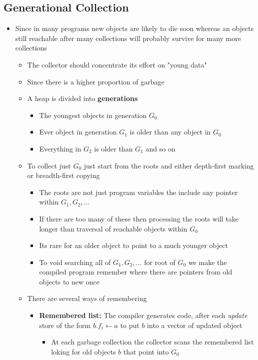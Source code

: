 \documentclass[11pt]{article}
\begin{document}
\subsection{Generational Collection}
\label{sec:org2b41a7a}
\begin{itemize}
\item Since in many programs new objects are likely to die soon whereas an objects still reachable after many collections will probably survive for many more collections 
\begin{itemize}
\item The collector should concentrate its effort on "young data"
\item Since there is a higher proportion of garbage
\item A heap is divided into \textbf{generations}
\begin{itemize}
\item The youngest objects in generation \(G_0\)
\item Ever object in generation \(G_1\) is older than any object in \(G_0\)
\item Everything in \(G_2\) is older than \(G_1\) and so on
\end{itemize}
\item To collect just \(G_0\) just start from the roots and either depth-first marking or breadth-first copying
\begin{itemize}
\item The roots are not just program variables the include any pointer within \(G_1,G_2, \dots\)
\item If there are too many of these then processing the roots will take longer than traversal of reachable objects within \(G_0\)
\item Its rare for an older object to point to a much younger object
\item To void searching all of \(G_1, G_2, \dots\) for root of \(G_0\) we make the compiled program remember where there are pointers from old objects to new once
\end{itemize}
\item There are several ways of remembering
\begin{itemize}
\item \textbf{Remembered list:} The compiler generates code, after each \emph{update} store of the form \(b.f_i \leftarrow a\) to put \(b\) into a vector of updated object
\begin{itemize}
\item At each garbage collection the collector scans the remembered list loking for old objects \(b\) that point into \(G_0\)

\end{itemize}
\end{itemize}
\end{itemize}
\end{itemize}
\end{document}
